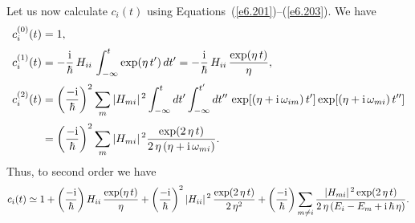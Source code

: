 Let us now calculate $c_i(t)$ using Equations~(\ref{e6.201})--(\ref{e6.203}). We have
\begin{align}
c_i^{(0)} (t) &= 1,\\[0.5ex]
c_i^{(1)} (t) &= -\frac{\rm i}{\hbar}\,H_{ii}\, \int_{-\infty}^t 
\exp(\eta \,t')\,dt'= -\frac{\rm i}{\hbar}\,H_{ii} \,\frac{\exp(
\eta\, t)}{\eta},\\[0.5ex]
c_i^{(2)} (t) &= \left(\frac{-{\rm i}}{\hbar} \right)^2
\sum_m |H_{mi}|^{\,2} \int_{-\infty}^t dt' \int_{-\infty}^{t'} dt''\,
\exp[(\eta+ {\rm i}\,\omega_{im})\, t'] \exp[
(\eta+ {\rm i}\,\omega_{mi})\, t'']\nonumber\\[0.5ex]
&= \left(\frac{-{\rm i}}{\hbar} \right)^2 \sum_m |H_{mi}|^{\,2} 
\frac{\exp(2 \,\eta\, t)}{2\,\eta\,(\eta + {\rm i}\,\omega_{mi})}.
\end{align}
Thus, to second order we have
\begin{equation}
c_i(t) \simeq 1 + \left(\frac{-{\rm i}}{\hbar}\right) H_{ii}\, \frac{\exp(\eta \,t)}{\eta}
+ \left(\frac{-{\rm i}}{\hbar} \right)^2  |H_{ii}|^{\,2} \,\frac{\exp(2\,\eta\, t)}
{2\, \eta^2} +\left(\frac{-{\rm i}}{\hbar}\right) \sum_{m\neq i}
\frac{|H_{mi}|^{\,2} \exp(2\,\eta\, t)}
{2\,\eta\,(E_i -E_m  + {\rm i}\,\hbar \,\eta)}.\label{e6.287}
\end{equation}

